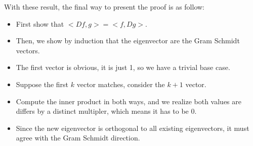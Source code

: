 With these result, the final way to present the proof is as follow:

\begin{itemize}
    \item First show that $ <Df, g> = <f, Dg> $.
    \item Then, we show by induction that the eigenvector are the Gram Schmidt vectors.
    \item The first vector is obvious, it is just 1, so we have a trivial base case.
    \item Suppose the first $ k $ vector matches, consider the $ k+1 $ vector.
    \item Compute the inner product in both ways, and we realize both values are differs by a distinct multipler, which means it has to be 0.
    \item Since the new eigenvector is orthogonal to all existing eigenvectors, it must agree with the Gram Schmidt direction.
\end{itemize}